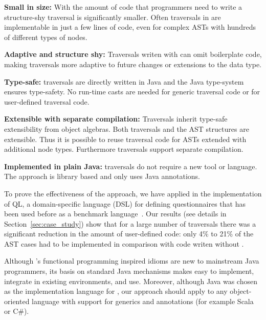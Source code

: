 \begin{itemize*}

\item {\bf Small in size:} With \name the amount of code that
  programmers need to write a structure-shy traversal is significantly smaller.
  Often traversals in \name are implementable in just a few lines
  of code, even for complex ASTs with hundreds of different types of
  nodes.

\item {\bf Adaptive and structure shy:}  Traversals writen with \name can omit
  boilerplate code, making traversals more adaptive to
  future changes or extensions to the data type.

\item {\bf Type-safe:} \name traversals are directly written in Java
  and the Java type-system ensures type-safety. No run-time casts are
  needed for generic traversal code or for user-defined traversal
  code. 

\item {\bf Extensible with separate compilation:} Traversals inherit type-safe
  extensibility from object algebras. Both traversals and the AST structures
  are extensible. Thus it is possible to
  reuse traversal code for ASTs extended with additional
  node types. Furthermore \name traversals support separate compilation.

\item {\bf Implemented in plain Java:} \name traversals do not require
  a new tool or language. The approach is library based and only uses
  Java annotations.


\end{itemize*}

To prove the effectiveness of the approach, we have applied \name in
the implementation of QL, a domain-specific language (DSL) for defining questionnaires that has been used before as a benchmark language~\cite{gouseti14extensible,erdweg2013state}.  Our results (see details in
Section~\ref{sec:case_study}) show that for a large number of traversals there was a
significant reduction in the amount of user-defined code: only 4\% to
21\% of the AST cases had to be implemented in comparison with code
writen without \name.

Although \name's functional programming inspired idioms are new to
mainstream Java programmers, its basis on standard Java 
mechanisms makes \name easy to implement, integrate in existing
environments, and use.  Moreover, although Java was chosen as the
implementation language for \Name, our approach should apply to any object-oriented
language with support for generics and annotations (for example Scala or C\#).

